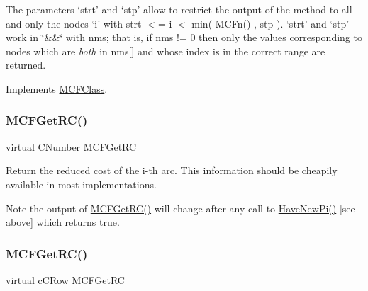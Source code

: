 The parameters `strt' and `stp' allow to restrict the output of the method to all and only the nodes `i' with strt $<$= i $<$ min( M\+C\+Fn() , stp ). `strt' and `stp' work in \char`\"{}\&\&\char`\"{} with nms; that is, if nms != 0 then only the values corresponding to nodes which are {\itshape both} in nms\mbox{[}\mbox{]} and whose index is in the correct range are returned. 

Implements \mbox{\hyperlink{class_m_c_f_class_a8c573c04800332c86ea31aeb80bbd7b1}{M\+C\+F\+Class}}.

\mbox{\label{class_m_c_f_cplex_a7c103b582c910ccfda354032aae5722e}} 
\subsubsection{\texorpdfstring{M\+C\+F\+Get\+R\+C()}{MCFGetRC()}\hspace{0.1cm}{\footnotesize\ttfamily [1/5]}}
{\footnotesize\ttfamily virtual \mbox{\hyperlink{class_m_c_f_class_a24d0627ba8213afe1ec4ebeb4508e8f1}{C\+Number}} M\+C\+F\+Get\+RC}

Return the reduced cost of the i-\/th arc. This information should be cheapily available in most implementations.

\begin{DoxyNote}{Note}
the output of \mbox{\hyperlink{class_m_c_f_class_af027cee8179a876a4879c73820c380d1}{M\+C\+F\+Get\+R\+C()}} will change after any call to \mbox{\hyperlink{class_m_c_f_class_a87b2b6516a7874ac55145312bd2d55bb}{Have\+New\+Pi()}} \mbox{[}see above\mbox{]} which returns true. 
\end{DoxyNote}
\mbox{\label{class_m_c_f_cplex_af027cee8179a876a4879c73820c380d1}} 
\subsubsection{\texorpdfstring{M\+C\+F\+Get\+R\+C()}{MCFGetRC()}\hspace{0.1cm}{\footnotesize\ttfamily [2/5]}}
{\footnotesize\ttfamily virtual \mbox{\hyperlink{class_m_c_f_class_ab700102e9ba8bb6015be6818d4e99097}{c\+C\+Row}} M\+C\+F\+Get\+RC\hspace{0.3cm}{\ttfamily [inline]}}

